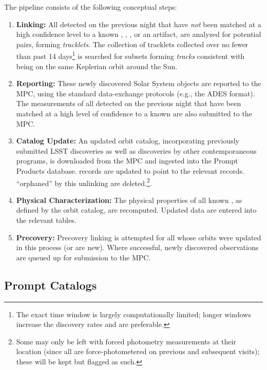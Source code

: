 The pipeline consists of the following conceptual steps:
\begin{enumerate}
\item {\bf Linking:} All \DIASources detected on the previous night that have \emph{not} been matched at a high confidence level to a known \Object,
\DIAObject, \SSObject, or an artifact, are analyzed for potential pairs, forming \emph{tracklets}. The collection of tracklets collected over no fewer than past 14 days\footnote{The exact time window is largely computationally limited; longer windows increase the discovery rates and are preferable.} is searched for subsets forming \emph{tracks} consistent with being on the same Keplerian orbit around the Sun.
\item {\bf Reporting:} These newly discovered Solar System objects are reported to the MPC, using the standard data-exchange protocols (e.g., the ADES format). The measurements of all \DIASources detected on the previous night that have been matched at a high level of confidence to a known \SSObject are also submitted to the MPC.
\item {\bf Catalog Update:} An updated orbit catalog, incorporating previously submitted LSST discoveries as well as discoveries by other contemporaneous programs, is downloaded from the MPC and ingested into the Prompt Products database. \DIASource records are updated to point to the relevant \SSObject records. \DIAObjects ``orphaned'' by this unlinking are deleted.\footnote{Some \DIAObjects may only be left with forced photometry measurements at their location (since all \DIAObjects are force-photometered on previous and subsequent visits);  these will be kept but flagged as such.}.
\item {\bf Physical Characterization:} The physical properties of all known \SSObjects, as defined by the orbit catalog, are recomputed.  Updated data are entered into the relevant tables.
\item {\bf Precovery:} Precovery linking is attempted for all \SSObjects whose orbits were updated in this process (or are new). Where successful, newly discovered observations are queued up for submission to the MPC.
\end{enumerate}

\subsection{Prompt Catalogs}
\label{sec:level1db}

